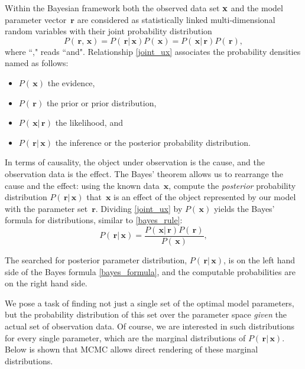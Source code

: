 \documentclass[preprint2]{aastex}
\newcommand{\bfr}{\,\mathbf{r}}
\newcommand{\bfx}{\,\mathbf{x}}
\begin{document}
Within the Bayesian framework both the observed data set $\bf{x}$ and the model parameter vector $\bfr$ are considered as statistically linked multi-dimensional random variables with their joint probability distribution
\begin{equation}
  \label{joint_ux}
  P(\bfr,\bfx) =  P(\bfr|\bfx)P(\bfx) = P(\bfx|\bfr)P(\bfr),
\end{equation}
where ``," reads ``and". Relationship \eqref{joint_ux} associates the probability densities named as follows:
\begin{itemize}
  \item[-] $P(\bfx)$ the evidence,
  \item[-] $P(\bfr)$ the prior or prior distribution,
  \item[-] $P(\bfx|\bfr)$ the likelihood, and
  \item[-] $P(\bfr|\bfx)$ the inference or the posterior probability distribution.
\end{itemize}
In terms of causality, the object under observation is the cause, and the observation data is the effect. The Bayes' theorem allows us to rearrange the cause and the effect: using the known data $\bfx$, compute the \emph{posterior} probability distribution $P(\bfr|\bfx)$ that $\bfx$ is an effect of the object represented by our model with the parameter set $\bfr$. 
Dividing \eqref{joint_ux} by $P(\bfx)$ yields the Bayes' formula for distributions, similar to \eqref{bayes_rule}:
\begin{equation}
  \label{bayes_formula}
  P(\bfr|\bfx) =  \frac{P(\bfx|\bfr)P(\bfr)}{P(\bfx)},
\end{equation}

The searched for posterior parameter distribution, $P(\bfr|\bfx)$, is on the left hand side of the Bayes formula \eqref{bayes_formula}, and the computable probabilities are on the right hand side. 

We pose a task of finding not just a single set of the optimal model parameters, but the probability distribution of this set over the parameter space \emph{given} the actual set of observation data. Of course, we are interested in such distributions for every single parameter, which are the marginal distributions of $P(\bfr|\bfx)$. Below is shown that MCMC allows direct rendering of these marginal distributions. 
\end{document}
